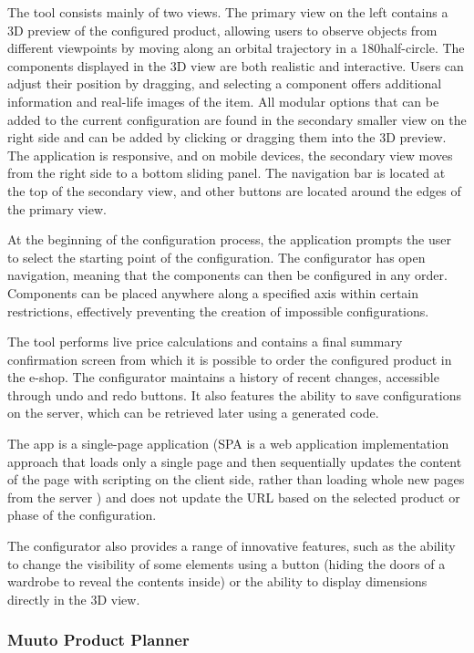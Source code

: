 The tool consists mainly of two views. The primary view on the left contains a 3D preview of the configured product, allowing users to observe objects from different viewpoints by moving along an orbital trajectory in a 180\textdegree half-circle. The components displayed in the 3D view are both realistic and interactive. Users can adjust their position by dragging, and selecting a component offers additional information and real-life images of the item. All modular options that can be added to the current configuration are found in the secondary smaller view on the right side and can be added by clicking or dragging them into the 3D preview. The application is responsive, and on mobile devices, the secondary view moves from the right side to a bottom sliding panel. The navigation bar is located at the top of the secondary view, and other buttons are located around the edges of the primary view.

At the beginning of the configuration process, the application prompts the user to select the starting point of the configuration. The configurator has open navigation, meaning that the components can then be configured in any order. Components can be placed anywhere along a specified axis within certain restrictions, effectively preventing the creation of impossible configurations.

The tool performs live price calculations and contains a final summary confirmation screen from which it is possible to order the configured product in the e-shop. The configurator maintains a history of recent changes, accessible through undo and redo buttons. It also features the ability to save configurations on the server, which can be retrieved later using a generated code.

The app is a single-page application (SPA is a web application implementation approach that loads only a single page and then sequentially updates the content of the page with scripting on the client side, rather than loading whole new pages from the server \cite{Fink2014}) and does not update the URL based on the selected product or phase of the configuration.

The configurator also provides a range of innovative features, such as the ability to change the visibility of some elements using a button (hiding the doors of a wardrobe to reveal the contents inside) or the ability to display dimensions directly in the 3D view.


\subsubsection{Muuto Product Planner}

